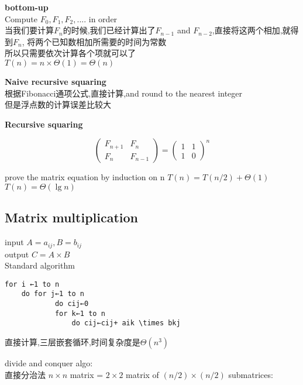 \documentclass{article}
\begin{document}
\textbf{bottom-up}\\
Compute $F_0,F_1,F_2,....$ in order\\
当我们要计算$F_n$的时候,我们已经计算出了$F_{n-1}$ and $F_{n-2}$,直接将这两个相加,就得到$F_n$, 将两个已知数相加所需要的时间为常数\\
所以只需要依次计算各个项就可以了\\
$T(n)=n \times \Theta(1)=\Theta(n)$

\textbf{Naive recursive squaring}\\
根据Fibonacci通项公式,直接计算,and round to the nearest integer\\
但是浮点数的计算误差比较大

\textbf{Recursive squaring}
\begin{theorem}
$$
\left(
  \begin{array}{cc}
		  F_{n+1} & F_n \\
		  F_n & F_{n-1}
  \end{array}
\right)
=
\left(
  \begin{array}{cc}
		  1 & 1 \\
		  1 & 0
  \end{array}
\right)^n
$$
\end{theorem}
prove the matrix equation by induction on n
$T(n)=T(n/2)+\Theta(1)$
$T(n)=\Theta(\lg n)$

\subsection{Matrix multiplication}
input $A=a_{ij}, B=b_{ij}$\\
output $C=A \times B$\\
Standard algorithm
\begin{verbatim}
for i ←1 to n
	do for j←1 to n
			do cij←0
			for k←1 to n
				do cij←cij+ aik \times bkj
\end{verbatim}
直接计算,三层嵌套循环,时间复杂度是$\Theta(n^3)$

divide and conquer algo:\\
直接分治法
$n×n$ matrix = $2×2$ matrix of $(n/2)×(n/2)$ submatrices:
\end{document}
